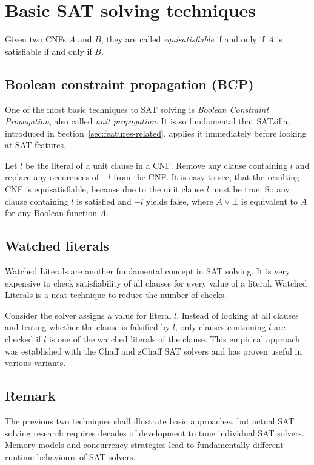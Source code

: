 \section{Basic SAT solving techniques}
\label{sec:sat-solving}
%
\begin{defi}
  Given two CNFs $A$ and $B$, they are called \emph{equisatisfiable} if and only
  if $A$ is satisfiable if and only if $B$.
\end{defi}

\subsection{Boolean constraint propagation (BCP)}
\label{sec:sat-bcp}
%
One of the most basic techniques to SAT solving is \emph{Boolean Constraint Propagation},
also called \emph{unit propagation}.
It is so fundamental that SATzilla, introduced in Section~\ref{sec:features-related},
applies it immediately before looking at SAT features.

Let $l$ be the literal of a unit clause in a CNF. Remove any clause containing
$l$ and replace any occurences of $-l$ from the CNF. It is easy to see, that
the resulting CNF is equisatisfiable, because due to the unit clause $l$ must
be true. So any clause containing $l$ is satisfied and $-l$ yields false,
where $A \lor \bot$ is equivalent to $A$ for any Boolean function $A$.

\subsection{Watched literals}
\label{sec:sat-wl}
%
Watched Literals are another fundamental concept in SAT solving. It is very
expensive to check satisfiability of all clauses for every value of a literal.
Watched Literals is a neat technique to reduce the number of checks.

Consider the solver assigns a value for literal $l$. Instead of looking at
all clauses and testing whether the clause is falsified by $l$, only clauses
containing $l$ are checked if $l$ is one of the watched literals of the clause.
This empirical approach was established with the Chaff and zChaff SAT solvers
and has proven useful in various variants.

\subsection{Remark}
\label{sec:sat-remark}
%
The previous two techniques shall illustrate basic approaches, but actual SAT
solving research requires decades of development to tune individual SAT solvers.
Memory models and concurrency strategies lead to fundamentally different runtime
behaviours of SAT solvers.

